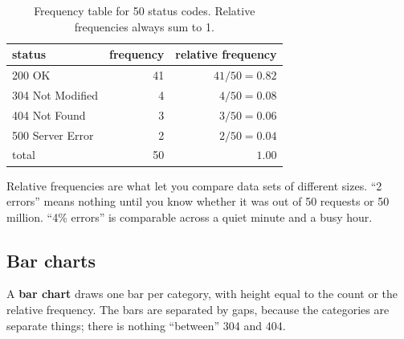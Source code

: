 \begin{table}[H]
\centering
\begin{tabular}{lrr}
\toprule
status & frequency & relative frequency\\
\midrule
200 OK            & 41 & $41/50 = 0.82$\\
304 Not Modified  & 4  & $4/50 = 0.08$\\
404 Not Found     & 3  & $3/50 = 0.06$\\
500 Server Error  & 2  & $2/50 = 0.04$\\
\midrule
total             & 50 & $1.00$\\
\bottomrule
\end{tabular}
\caption{Frequency table for 50 status codes. Relative frequencies always sum to 1.}
\label{tab:data-status}
\end{table}

Relative frequencies are what let you compare data sets of different sizes. ``2 errors'' means
nothing until you know whether it was out of 50 requests or 50 million. ``4\% errors'' is
comparable across a quiet minute and a busy hour.

\subsection{Bar charts}

A \textbf{bar chart} draws one bar per category, with height equal to the count or the
relative frequency. The bars are separated by gaps, because the categories are separate
things; there is nothing ``between'' 304 and 404.


